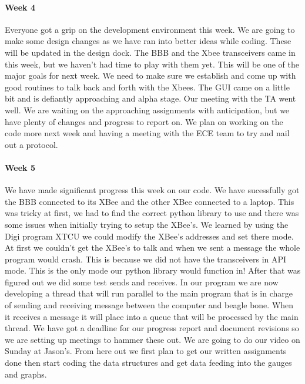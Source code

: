 \documentclass[10pt,draftclsnofoot,onecolumn,retainorgcmds]{IEEEtran}
\begin{document}
\paragraph{Week 4}
 Everyone got a grip on the development environment this week. We are going to make some design changes as we have ran into better ideas while coding. These will be updated in the design dock. The BBB and the Xbee transceivers came in this week, but we haven't had time to play with them yet. This will be one of the major goals for next week. We need to make sure we establish and come up with good routines to talk back and forth with the Xbees. The GUI came on a little bit and is defiantly approaching and alpha stage. Our meeting with the TA went well. We are waiting on the approaching assignments with anticipation, but we have plenty of changes and progress to report on. We plan on working on the code more next week and having a meeting with the ECE team to try and nail out a protocol. \\
\paragraph{Week 5}
We have made significant progress this week on our code. We have sucessfully got the BBB connected to its XBee and the other XBee connected to a laptop. This was tricky at first, we had to find the correct python library to use and there was some issues when initially trying to setup the XBee's. We learned by using the Digi program XTCU we could modify the XBee's addresses and set there mode. At first we couldn't get the XBee's to talk and when we sent a message the whole program would crash. This is because we did not have the transceivers in API mode. This is the only mode our python library would function in! After that was figured out we did some test sends and receives. In our program we are now developing a thread that will run parallel to the main program that is in charge of sending and receiving message between the computer and beagle bone. When it receives a message it will place into a queue that will be processed by the main thread. We have got a deadline for our progress report and document revisions so we are setting up meetings to hammer these out. We are going to do our video on Sunday at Jason's. From here out we first plan to get our written assignments done then start coding the data structures and get data feeding into the gauges and graphs. \\
\end{document}
